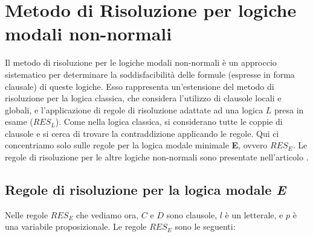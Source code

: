 \documentclass[a4paper,12pt]{report}
\begin{document}
\section{Metodo di Risoluzione per logiche modali non-normali}
Il metodo di risoluzione per le logiche modali non-normali è un approccio sistematico per determinare la soddisfacibilità delle formule (espresse in forma clausale) di queste logiche. Esso rappresenta un'estensione del metodo di risoluzione per la logica classica, che considera l'utilizzo di clausole locali e globali, e l'applicazione di regole di risoluzione adattate ad una logica $L$ presa in esame ($RES_L$). Come nella logica classica, si considerano tutte le coppie di clausole e si cerca di trovare la contraddizione applicando le regole. Qui ci concentriamo solo sulle regole per la logica modale minimale \textbf{E}, ovvero $RES_E$. Le regole di risoluzione per le altre logiche non-normali sono presentate nell'articolo \cite{Articolo_resolution}.

\subsection{Regole di risoluzione per la logica modale \emph{E}}
Nelle regole $RES_E$ che vediamo ora, $C$ e $D$ sono clausole, $l$ è un letterale, e $p$ è una variabile proposizionale. Le regole $RES_E$ sono le seguenti:




    
\end{document}
